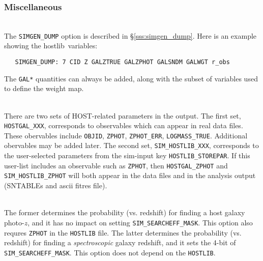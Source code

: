 \documentclass[12pt]{article}
\newcommand{\hostlib}{{\sc hostlib}}
\begin{document}
{%
\subsubsection{Miscellaneous}
\label{sss:hostlob_misc}

 \\
The {\tt SIMGEN\_DUMP} option is described in 
\S\ref{sss:simgen_dump}. Here is an example showing
the \hostlib\ variables:
\begin{verbatim}
   SIMGEN_DUMP: 7 CID Z GALZTRUE GALZPHOT GALSNDM GALWGT r_obs
\end{verbatim}
%
The {\tt GAL*} quantities can always be added,
along with the subset of variables used to define
the weight map. 


\bigskip
{} \\
There are two sets of HOST-related parameters in the output.
The first set, {\tt HOSTGAL\_XXX}, corresponds to observables
which can appear in real data files. These obervables include
{\tt OBJID}, {\tt ZPHOT}, {\tt ZPHOT\_ERR}, {\tt LOGMASS\_TRUE}.
Additional obervables may be added later.  The second set,
{\tt SIM\_HOSTLIB\_XXX}, corresponds to the user-selected
parameters from the sim-input key {\tt HOSTLIB\_STOREPAR}.
If this user-list includes an observable such as {\tt ZPHOT},
then {\tt HOSTGAL\_ZPHOT} and {\tt SIM\_HOSTLIB\_ZPHOT} 
will both appear in the data files and in the 
analysis output (SNTABLEs and ascii fitres file).


\bigskip 
{}\\
The former determines the probability (vs. redshift) for finding
a host galaxy photo-$z$, and it has no impact on setting
{\tt SIM\_SEARCHEFF\_MASK}. This option also requres {\tt ZPHOT} 
in the {\tt HOSTLIB} file.
The latter determines the probability (vs. redshift) for finding
a {\it spectroscopic} galaxy redshift, and it sets the 4-bit of
{\tt SIM\_SEARCHEFF\_MASK}. This option does not depend on the
{\tt HOSTLIB}.



}
\end{document}
